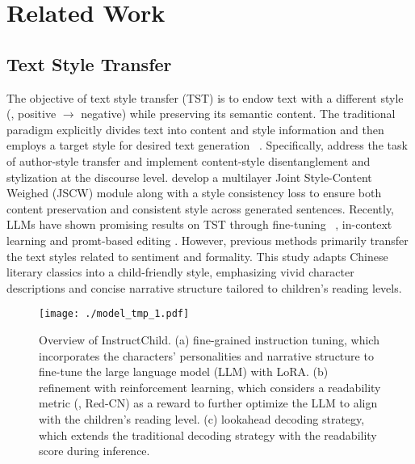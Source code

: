 \section{Related Work}
\subsection{Text Style Transfer}
The objective of text style transfer (TST) is to endow text with a different style (\eg, positive $\rightarrow$ negative) while preserving its semantic content. 
The traditional paradigm explicitly divides text into content and style information and then employs a target style for desired text generation ~\cite{yl-sen-con,storytrans,tst-sc2}.
Specifically, \citet{storytrans} address the task of author-style transfer and implement content-style disentanglement and stylization at the discourse level.
\citet{tst-sc2} develop a multilayer Joint Style-Content Weighed (JSCW) module along with a style consistency loss to ensure both content preservation and consistent style across generated sentences.
Recently, LLMs have shown promising results on TST through fine-tuning ~\cite{tst-ft-1, tst-ft-2}, in-context learning \cite{tst-icl-1,tst-icl-3} and promt-based editing \cite{p-r,tst-pd-2}.
However, previous methods primarily transfer the text styles related to sentiment and formality.
This study adapts Chinese literary classics into a child-friendly style, emphasizing vivid character descriptions and concise narrative structure tailored to children’s reading levels.
\begin{figure*}[]
  \centering
  \texttt{[image: ./model\_tmp\_1.pdf]}
  \caption{Overview of InstructChild.
  (a) fine-grained instruction tuning, which incorporates the characters' personalities and narrative structure to fine-tune the large language model (LLM) with LoRA.
  (b) refinement with reinforcement learning, which considers a readability metric (\ie, Red-CN) as a reward to further optimize 
  the LLM to align with the children's reading level.
  (c) lookahead decoding strategy, which extends the traditional decoding strategy with the readability score during inference. } 
  \label{framework}
\end{figure*}


